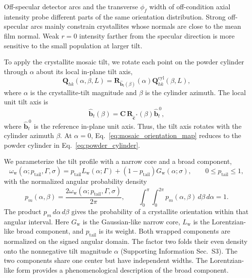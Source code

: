 Off-specular detector arcs and the transverse $\phi_f$ width of off-condition axial intensity probe different parts of the same orientation distribution. Strong off-specular arcs mainly constrain crystallites whose normals are close to the mean film normal. Weak $r=0$ intensity farther from the specular direction is more sensitive to the small population at larger tilt.

To apply the crystallite mosaic tilt, we rotate each point on the powder cylinder through $\alpha$ about its local in-plane tilt axis,
\begin{equation}
  \mathbf Q_{hk}(\alpha,\beta,L)
  =\mathbf R_{\widehat{\mathbf b}_t(\beta)}(\alpha)
   \mathbf Q^{\mathrm{cyl}}_{hk}(\beta,L),
  \label{eq:mosaic_orientation_map}
\end{equation}
where $\alpha$ is the crystallite-tilt magnitude and $\beta$ is the cylinder azimuth. The local unit tilt axis is
\[
  \widehat{\mathbf b}_t(\beta)
  =\mathbf C\,\mathbf R_{\widehat{\mathbf c}^{\,*}}(\beta)
   \widehat{\mathbf b}_t^{\,0},
\]
where $\widehat{\mathbf b}_t^{\,0}$ is the reference in-plane unit axis. Thus, the tilt axis rotates with the cylinder azimuth $\beta$. At $\alpha=0$, Eq.~\eqref{eq:mosaic_orientation_map} reduces to the powder cylinder in Eq.~\eqref{eq:powder_cylinder}.

We parameterize the tilt profile with a narrow core and a broad component,
\begin{equation}
  \omega_{\mathrm w}(\alpha;p_{\mathrm{tail}},\Gamma,\sigma)
  =p_{\mathrm{tail}}L_{\mathrm w}(\alpha;\Gamma)
  +(1-p_{\mathrm{tail}})G_{\mathrm w}(\alpha;\sigma),
  \qquad 0\le p_{\mathrm{tail}}\le1,
  \label{eq:mosaic_two_component_maintext}
\end{equation}
with the normalized angular probability density
\begin{equation}
  p_m(\alpha,\beta)=\frac{2\omega_{\mathrm w}(\alpha;p_{\mathrm{tail}},\Gamma,\sigma)}{2\pi},
  \qquad
  \int_0^\pi\!\int_0^{2\pi}p_m(\alpha,\beta)\,d\beta\,d\alpha=1.
  \label{eq:mosaic_orientation_density}
\end{equation}
The product $p_m\,d\alpha\,d\beta$ gives the probability of a crystallite orientation within that angular interval. Here $G_{\mathrm w}$ is the Gaussian-like narrow core, $L_{\mathrm w}$ is the Lorentzian-like broad component, and $p_{\mathrm{tail}}$ is its weight. Both wrapped components are normalized on the signed angular domain. The factor two folds their even density onto the nonnegative tilt magnitude $\alpha$ (Supporting Information Sec.~S3). The two components share one center but have independent widths. The Lorentzian-like form provides a phenomenological description of the broad component.

